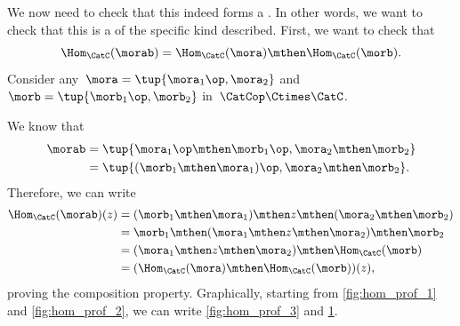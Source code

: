 
We now need to check that this indeed forms a .
In other words, we want to check that this is a  of the specific kind described.
First, we want to check that
%
\begin{equation}
    \label{eq:hom5}
    \Hom_{\CatC}(\morab)=\Hom_{\CatC}(\mora)\mthen \Hom_{\CatC}(\morb).
\end{equation}
Consider any~$\mora=\tup{\mora_1\op, \mora_2}$ and~$\morb=\tup{\morb_1\op,\morb_2}$ in~$\CatCop \Ctimes \CatC$.

We know that
\begin{equation}
    \label{eq:hom6}
    \begin{aligned}
        \morab & =\tup{\mora_1\op \mthen \morb_1\op, \mora_2\mthen \morb_2} \\
               & =\tup{(\morb_1\mthen \mora_1)\op, \mora_2\mthen \morb_2}.
    \end{aligned}
\end{equation}
Therefore, we can write
\begin{equation}
    \label{eq:hom7}
    \begin{aligned}
        \Hom_{\CatC}(\morab)(z) & =(\morb_1\mthen \mora_1)\mthen z \mthen (\mora_2\mthen \morb_2) \\
                                & =\morb_1\mthen (\mora_1\mthen z \mthen \mora_2) \mthen \morb_2 \\
                                & =(\mora_1\mthen z \mthen \mora_2)\mthen \Hom_{\CatC}(\morb) \\
                                & =(\Hom_{\CatC}(\mora)\mthen \Hom_{\CatC}(\morb))(z),
    \end{aligned}
\end{equation}
proving the composition property.
Graphically, starting from \cref{fig:hom_prof_1} and \cref{fig:hom_prof_2}, we can write \cref{fig:hom_prof_3} and \cref{fig:hom_prof_4}.

\begin{marginfigure}
    \centering
    \caption{}
    \label{fig:hom_prof_1}
\end{marginfigure}
\begin{marginfigure}
    \centering
    \caption{}
    \label{fig:hom_prof_2}
\end{marginfigure}
\begin{marginfigure}
    \centering
    \caption{}
    \label{fig:hom_prof_3}
\end{marginfigure}
\begin{figure}[h!]
    \centering
    \caption{}
    \label{fig:hom_prof_4}
\end{figure}


